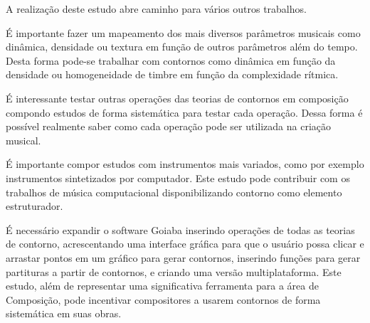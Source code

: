 A realização deste estudo abre caminho para vários outros trabalhos.


É importante fazer um mapeamento dos mais diversos parâmetros musicais
como dinâmica, densidade ou textura em função de outros parâmetros
além do tempo. Desta forma pode-se trabalhar com contornos como
dinâmica em função da densidade ou homogeneidade de timbre em função
da complexidade rítmica.


É interessante testar outras operações das teorias de contornos em
composição compondo estudos de forma sistemática para testar cada
operação. Dessa forma é possível realmente saber como cada operação
pode ser utilizada na criação musical.

É importante compor estudos com instrumentos mais variados, como por
exemplo instrumentos sintetizados por computador. Este estudo pode
contribuir com os trabalhos de música computacional disponibilizando
contorno como elemento estruturador.


É necessário expandir o software Goiaba inserindo operações de todas
as teorias de contorno, acrescentando uma interface gráfica para que o
usuário possa clicar e arrastar pontos em um gráfico para gerar
contornos, inserindo funções para gerar partituras a partir de
contornos, e criando uma versão multiplataforma. Este estudo, além de
representar uma significativa ferramenta para a área de Composição,
pode incentivar compositores a usarem contornos de forma sistemática
em suas obras.

